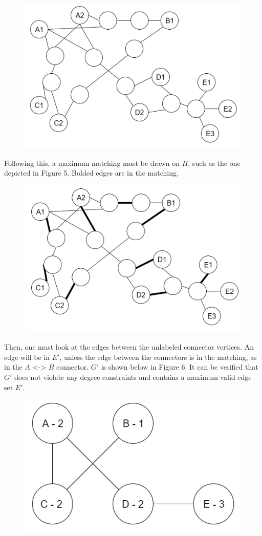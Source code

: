 \documentclass{article}
\begin{document}
	\begin{figure}[H]
		\caption{}
		\includegraphics{Figure4}
	\end{figure}

	Following this, a maximum matching must be drawn on $H$, such as the one depicted in Figure 5. Bolded edges are in the matching.
	
		\begin{figure}[H]
		\caption{}
		\includegraphics{Figure5}
	\end{figure}
		 		\vbox{%
	Then, one must look at the edges between the unlabeled connector vertices. An edge will be in $E'$, unless the edge between the connectors is in the matching, as in the $A$ <-> $B$ connector. $G'$ is shown below in Figure 6. It can be verified that $G'$ does not violate any degree constraints and contains a maximum valid edge set $E'$.
}
	\begin{figure}[H]
		\caption{}
		\includegraphics{Figure6}
	\end{figure}
\end{document}
